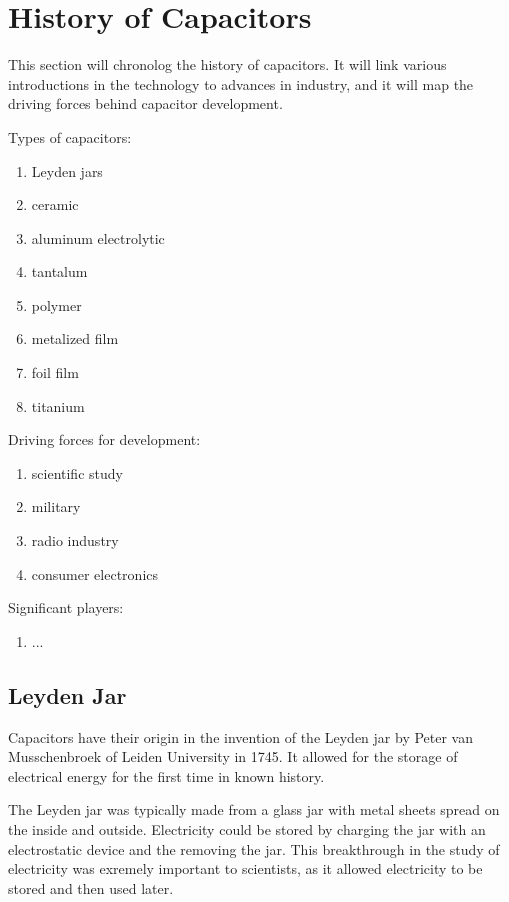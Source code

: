 \section {History of Capacitors}
This section will chronolog the history of capacitors. It will link various introductions in the technology to advances in industry, and it will map the driving forces behind capacitor development.

\noindent Types of capacitors:
\begin{enumerate}
    \item Leyden jars
    \item ceramic 
    \item aluminum electrolytic 
    \item tantalum 
    \item polymer
    \item metalized film
    \item foil film
    \item titanium 
\end {enumerate}

\noindent Driving forces for development:
\begin {enumerate}
    \item scientific study
    \item military
    \item radio industry
    \item consumer electronics
\end {enumerate}

\noindent Significant players:
\begin{enumerate}
    \item ...
\end {enumerate}

\subsection{Leyden Jar}


\noindent Capacitors have their origin in the invention of the Leyden jar by Peter van Musschenbroek of Leiden University in 1745. \cite{empLight} It allowed for the storage of electrical energy for the first time in known history. 

\noindent The Leyden jar was typically made from a glass jar with metal sheets spread on the inside and outside. Electricity could be stored by charging the jar with an electrostatic device and the removing the jar. This breakthrough in the study of electricity was exremely important to scientists, as it allowed electricity to be stored and then used later.
\cite{ieee_hist} 

